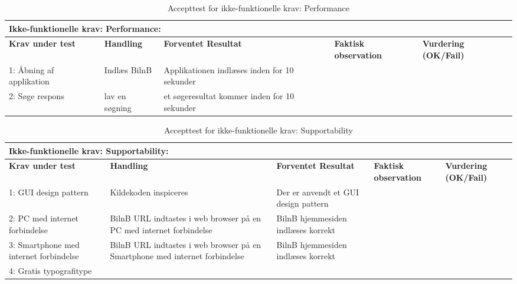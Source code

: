 \begin{table}[H] 
	\centering 
	\begin{tabular}{|p{3cm}|p{3cm}|p{3cm}|p{2cm}|p{2cm}|} %
		\toprule 	%
		\multicolumn{5}{|l|}{\textbf{Ikke-funktionelle krav: Performance:}}\\\midrule
			\textbf{Krav under test} & \textbf{Handling} & \textbf{Forventet Resultat} & \textbf{Faktisk observation} & \textbf{Vurdering (OK/Fail)} \\ \midrule 	%
		1: Åbning af applikation  & Indlæs BilnB  & Applikationen indlæses inden for 10 sekunder &  &   \\ \hline
		2: Søge respons  & lav en søgning  & et søgeresultat kommer inden for 10 sekunder  & &  \\ \hline
\bottomrule
	\end{tabular} 
	\caption{Accepttest for ikke-funktionelle krav: Performance} 
	\label{tab:Accept_Per} 
\end{table}

\begin{table}[H] 
	\centering 
	\begin{tabular}{|p{3cm}|p{3cm}|p{3cm}|p{2cm}|p{2cm}|} %
		\toprule 	%
		\multicolumn{5}{|l|}{\textbf{Ikke-funktionelle krav: Supportability:}}\\\midrule
			\textbf{Krav under test} & \textbf{Handling} & \textbf{Forventet Resultat} & \textbf{Faktisk observation} & \textbf{Vurdering (OK/Fail)} \\ \midrule 	%
		1: GUI design pattern & Kildekoden inspiceres  & Der er anvendt et GUI design pattern &  &   \\ \hline
		2: PC med internet forbindelse  & BilnB URL indtastes i web browser på en PC med internet forbindelse & BilnB hjemmesiden indlæses korrekt & &  \\ \hline
		3: Smartphone med internet forbindelse & BilnB URL indtastes i web browser på en Smartphone med internet forbindelse & BilnB hjemmesiden indlæses korrekt & & \\ \hline
		4: Gratis typografitype & & & &  \\ \hline
\bottomrule
	\end{tabular} 
	\caption{Accepttest for ikke-funktionelle krav: Supportability} 
	\label{tab:Accept_Sup} 
\end{table}


    